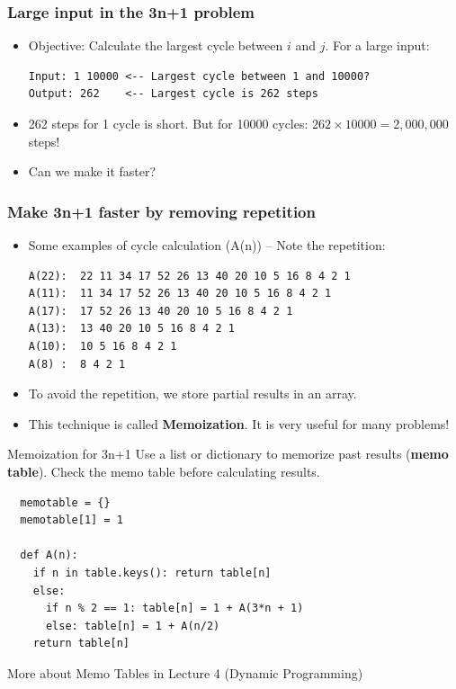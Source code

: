 \begin{frame}[fragile]
  \frametitle{Large input in the 3n+1 problem}

    \begin{itemize}
      \item Objective: Calculate the largest cycle between $i$ and $j$. For a large input:
    \begin{verbatim}
Input: 1 10000 <-- Largest cycle between 1 and 10000?
Output: 262    <-- Largest cycle is 262 steps
    \end{verbatim}

      \item 262 steps for 1 cycle is short. But for 10000 cycles: $262\times10000 = 2,000,000$ steps!\medskip

      \item Can we make it faster?


    \end{itemize}
\end{frame}

\begin{frame}[fragile]
  \frametitle{Make 3n+1 faster by removing repetition}

  \begin{itemize}
    \item Some examples of cycle calculation (A(n)) -- Note the repetition:
\begin{verbatim}
A(22):  22 11 34 17 52 26 13 40 20 10 5 16 8 4 2 1
A(11):  11 34 17 52 26 13 40 20 10 5 16 8 4 2 1
A(17):  17 52 26 13 40 20 10 5 16 8 4 2 1
A(13):  13 40 20 10 5 16 8 4 2 1
A(10):  10 5 16 8 4 2 1
A(8) :  8 4 2 1
\end{verbatim}\medskip

    \item To avoid the repetition, \alert{we store partial results in an array}.
    \medskip

    \item This technique is called {\bf Memoization}. It is very useful for many problems!
  \end{itemize}

\end{frame}

\begin{frame}[fragile]{Memoization for 3n+1}
  Use a list or dictionary to memorize past results ({\bf memo table}). Check the memo table before calculating results.
\begin{verbatim}
  memotable = {}
  memotable[1] = 1

  def A(n):
    if n in table.keys(): return table[n]
    else:
      if n % 2 == 1: table[n] = 1 + A(3*n + 1)
      else: table[n] = 1 + A(n/2)
    return table[n]
\end{verbatim}
More about Memo Tables in Lecture 4 (Dynamic Programming)
\end{frame}



